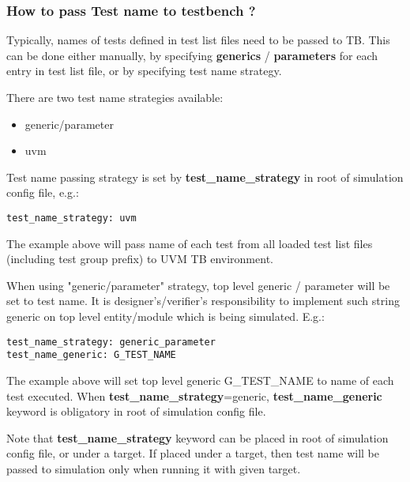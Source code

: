 \documentclass{tropic_design_spec}
\begin{document}
\subsubsection{How to pass Test name to testbench ?}
\label{sec:how-to-pass-test-name-to-testbench}

Typically, names of tests defined in test list files need to be passed to TB. This can
be done either manually, by specifying \textbf{generics} / \textbf{parameters} for each
entry in test list file, or by specifying test name strategy.

There are two test name strategies available:
\begin{itemize}
    \item generic/parameter
    \item uvm
\end{itemize}

Test name passing strategy is set by \textbf{test_name_strategy} in root of simulation
config file, e.g.:

\begin{lstlisting}
test_name_strategy: uvm
\end{lstlisting}

The example above will pass name of each test from all loaded test list files (including
test group prefix) to UVM TB environment.

When using "generic/parameter" strategy, top level generic / parameter will be set to test name. It
is designer's/verifier's responsibility to implement such string generic on top level
entity/module which is being simulated. E.g.:

\begin{lstlisting}
test_name_strategy: generic_parameter
test_name_generic: G_TEST_NAME
\end{lstlisting}

The example above will set top level generic G_TEST_NAME to name of each test executed.
When \textbf{test_name_strategy}=generic, \textbf{test_name_generic} keyword is obligatory
in root of simulation config file.

Note that \textbf{test_name_strategy} keyword can be placed in root of simulation config
file, or under a target. If placed under a target, then test name will be passed to
simulation only when running it with given target.


\end{document}

